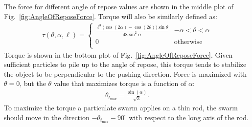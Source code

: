 
The force for different angle of repose values are shown in the middle plot of Fig.~\ref{fig:AngleOfReposeForce}. 
Torque will also be similarly defined as:
\begin{align}
\tau(\theta, \alpha, \ell) =\left\{
\begin{array}{ll}
\frac{\ell^3\Big(\cos(2\alpha)-\cos(2\theta)\Big)\sin{\theta} }{48\sin^2\alpha}&   -\alpha<\theta<\alpha\\
0 &    \textrm{otherwise}\\
\end{array} 
\right.
\end{align}
Torque is shown in the bottom plot of Fig.~\ref{fig:AngleOfReposeForce}.
 Given sufficient particles to pile up to the angle of repose, this torque tends to stabilize the object to be perpendicular to the pushing direction.
Force is maximized with $\theta=0$, but the $\theta$ value that maximizes torque is a function of $\alpha$:
\begin{align}
\theta_{t_{\max}} = \frac{\sin(\alpha)}{\sqrt{3}}.
\end{align}
To maximize the torque a particulate swarm applies on a thin rod, the swarm should move in the direction $-\theta_{t_{\max}} - 90^\circ$ with respect to the long axis of the rod.



